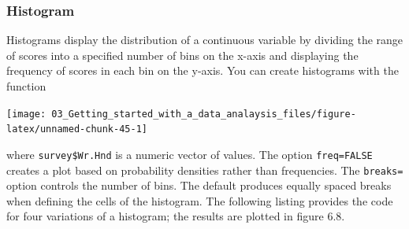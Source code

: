 \documentclass[
]{book}
\newenvironment{Shaded}{\begin{snugshade}}{\end{snugshade}}
\newcommand{\AttributeTok}[1]{\textcolor[rgb]{0.77,0.63,0.00}{#1}}
\newcommand{\DecValTok}[1]{\textcolor[rgb]{0.00,0.00,0.81}{#1}}
\newcommand{\FloatTok}[1]{\textcolor[rgb]{0.00,0.00,0.81}{#1}}
\newcommand{\FunctionTok}[1]{\textcolor[rgb]{0.00,0.00,0.00}{#1}}
\newcommand{\NormalTok}[1]{#1}
\newcommand{\SpecialCharTok}[1]{\textcolor[rgb]{0.00,0.00,0.00}{#1}}
\begin{document}
\hypertarget{histogram}{%
\subsubsection{Histogram}\label{histogram}}

Histograms display the distribution of a continuous variable by dividing the range of scores into a specified number of bins on the x-axis and displaying the frequency of scores in each bin on the y-axis. You can create histograms with the function

\begin{Shaded}
\end{Shaded}

\begin{center}\texttt{[image: 03\_Getting\_started\_with\_a\_data\_analaysis\_files/figure-latex/unnamed-chunk-45-1]} \end{center}

where \texttt{survey\$Wr.Hnd} is a numeric vector of values. The option \texttt{freq=FALSE} creates a plot based on probability densities rather than frequencies. The \texttt{breaks=} option controls the number of bins. The default produces equally spaced breaks when defining the cells of the histogram. The following listing provides the code for four variations of a histogram; the results are plotted in figure 6.8.
\end{document}
